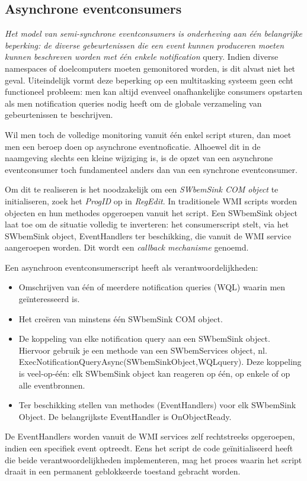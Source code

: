 \documentclass[11pt,a4paper]{report}
\begin{document}
\subsection{Asynchrone eventconsumers}
\textit{Het model van semi-synchrone eventconsumers is onderheving aan één belangrijke beperking: de diverse gebeurtenissen die een event kunnen produceren moeten kunnen beschreven worden met één enkele notification }query. Indien diverse namespaces of doelcomputers moeten gemonitored worden, is dit alvast niet het geval. Uiteindelijk vormt deze beperking op een multitasking systeem geen echt functioneel probleem: men kan altijd evenveel onafhankelijke consumers opstarten als men notification queries nodig heeft om de globale verzameling van gebeurtenissen te beschrijven.
\par Wil men toch de volledige monitoring vanuit één enkel script sturen, dan moet men een beroep doen op asynchrone eventnoficatie. Alhoewel dit in de naamgeving slechts een kleine wijziging is, is de opzet van een asynchrone eventconsumer toch fundamenteel anders dan van een synchrone eventconsumer.
\par Om dit te realiseren is het noodzakelijk om een \textit{SWbemSink COM object }te initialiseren, zoek het \textit{ProgID} op in \textit{RegEdit}. In traditionele WMI scripts worden objecten en hun methodes opgeroepen vanuit het script. Een SWbemSink object laat toe om de situatie volledig te inverteren: het consumerscript stelt, via het SWbemSink object, EventHandlers ter beschikking, die vanuit de WMI service aangeroepen worden. Dit wordt een \textit{callback mechanisme} genoemd.

Een asynchroon eventconsumerscript heeft als verantwoordelijkheden:
\begin{itemize}
	\item Omschrijven van één of meerdere notification queries (WQL) waarin men geïnteresseerd is.
	\item Het creëren van minstens één SWbemSink COM object.
	\item De koppeling van elke notification query aan een SWbemSink object. Hiervoor gebruik je een methode van een SWbemServices object, nl. ExecNotificationQueryAsync(SWbemSinkObject,WQLquery). Deze koppeling is veel-op-één: elk SWbemSink object kan reageren op één, op enkele of op alle eventbronnen.
	\item Ter beschikking stellen van methodes (EventHandlers) voor elk SWbemSink Object. De belangrijkste EventHandler is OnObjectReady.
\end{itemize}
De EventHandlers worden vanuit de WMI services zelf rechtstreeks opgeroepen, indien een specifiek event optreedt.
Eens het script de code geïnitialiseerd heeft die beide verantwoordelijkheden implementeren, mag het proces waarin het script draait in een permanent geblokkeerde toestand gebracht worden.
\end{document}
